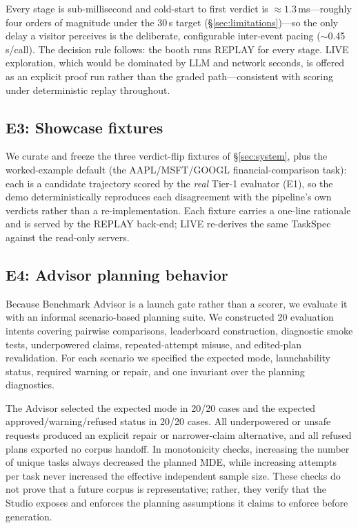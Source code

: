 \noindent Every stage is sub-millisecond and cold-start to first verdict is
${\approx}1.3$\,ms---roughly four orders of magnitude under the 30\,s target
(\S\ref{sec:limitations})---so the only delay a visitor perceives is the
deliberate, configurable inter-event pacing ($\sim$0.45\,s/call). The decision
rule follows: the booth runs REPLAY for every stage. LIVE exploration, which
would be dominated by LLM and network seconds, is offered as an explicit proof
run rather than the graded path---consistent with scoring under deterministic
replay throughout.

\subsection{E3: Showcase fixtures}

We curate and freeze the three verdict-flip fixtures of \S\ref{sec:system},
plus the worked-example default (the AAPL/MSFT/GOOGL financial-comparison task):
each is a candidate trajectory scored by the \emph{real} Tier-1 evaluator (E1),
so the demo deterministically reproduces each disagreement with the pipeline's
own verdicts rather than a re-implementation. Each fixture carries a one-line
rationale and is served by the REPLAY back-end; LIVE re-derives the same TaskSpec
against the read-only servers.

\subsection{E4: Advisor planning behavior}

Because Benchmark Advisor is a launch gate rather than a scorer, we evaluate it
with an informal scenario-based planning suite. We constructed 20 evaluation
intents covering pairwise comparisons, leaderboard construction, diagnostic
smoke tests, underpowered claims, repeated-attempt misuse, and edited-plan
revalidation. For each scenario we specified the expected mode, launchability
status, required warning or repair, and one invariant over the planning
diagnostics.

The Advisor selected the expected mode in 20/20 cases and the expected
approved/warning/refused status in 20/20 cases. All underpowered or unsafe
requests produced an explicit repair or narrower-claim alternative, and all
refused plans exported no corpus handoff. In monotonicity checks, increasing the
number of unique tasks always decreased the planned MDE, while increasing
attempts per task never increased the effective independent sample size. These
checks do not prove that a future corpus is representative; rather, they verify
that the Studio exposes and enforces the planning assumptions it claims to
enforce before generation.

